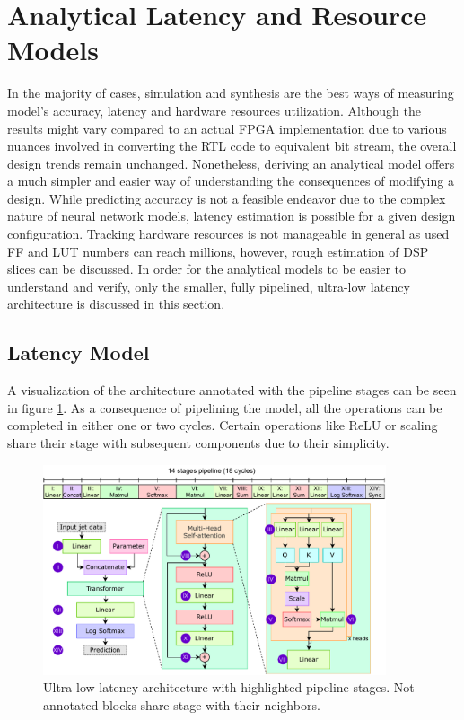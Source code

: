 \section{Analytical Latency and Resource Models}
In the majority of cases, simulation and synthesis are the best ways of measuring model's accuracy, latency and hardware resources utilization. Although the results might vary compared to an actual FPGA implementation due to various nuances involved in converting the RTL code to equivalent bit stream, the overall design trends remain unchanged. Nonetheless, deriving an analytical model offers a much simpler and easier way of understanding the consequences of modifying a design. While predicting accuracy is not a feasible endeavor due to the complex nature of neural network models, latency estimation is possible for a given design configuration. Tracking hardware resources is not manageable in general as used FF and LUT numbers can reach millions, however, rough estimation of DSP slices can be discussed. In order for the analytical models to be easier to understand and verify, only the smaller, fully pipelined, ultra-low latency architecture is discussed in this section.

\subsection{Latency Model}
A visualization of the architecture annotated with the pipeline stages can be seen in figure \ref{fig:pipeline-stages}. As a consequence of pipelining the model, all the operations can be completed in either one or two cycles. Certain operations like ReLU or scaling share their stage with subsequent components due to their simplicity.

\begin{figure}[hpt!]
  \centering
  \includegraphics[trim={0cm 0cm 0cm 0cm}, width=0.9\textwidth, center]{quantization/pipelining_stages.pdf}
  \caption{Ultra-low latency architecture with highlighted pipeline stages. Not annotated blocks share stage with their neighbors.}
  \label{fig:pipeline-stages}
\end{figure}

